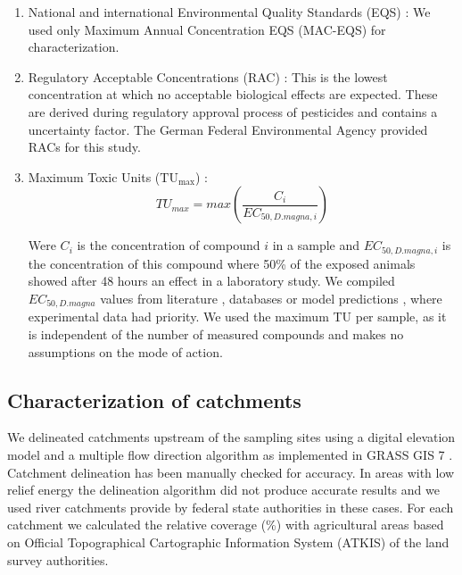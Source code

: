 \documentclass[journal=esthag,manuscript=article]{achemso}
\begin{document}
\begin{enumerate}
\item National and international Environmental Quality Standards (EQS) \citep{ogewv_verordnung_2011,european_union_directive_2013}:
We used only Maximum Annual Concentration EQS (MAC-EQS) for characterization.

\item Regulatory Acceptable Concentrations (RAC) \citep{brock_linking_2010}:
This is the lowest concentration at which no acceptable biological effects are expected. 
These are derived during regulatory approval  process of pesticides and contains a uncertainty factor.
The German Federal Environmental Agency provided RACs for this study.

\item Maximum Toxic Units ($\mathrm{TU_{max}}$)  \citep{sprague_measurement_1970}: 
\begin{equation}
TU_{max} = max(\frac{C_i}{EC_{50, D.magna, i}})
\end{equation}

Were $C_i$ is the concentration of compound $i$ in a sample and $EC_{50, D.magna, i}$ is the concentration of this compound where 50\% of the exposed animals showed after 48 hours an effect in a laboratory study.
We compiled $EC_{50, D.magna}$ values from literature \citep{malaj_organic_2014}, databases \citep{pesticide_action_network_pan_2015,u.s._epa_ecotoxicology_2015} or model predictions \citep{schuurmann_quantitative_2011}, where experimental data had priority.
We used the maximum TU per sample, as it is independent of the number of measured compounds and makes no assumptions on the mode of action.
\end{enumerate}


\subsection{Characterization of catchments}
We delineated catchments upstream of the sampling sites using a digital elevation model \citep{eea_digital_2013} and a multiple flow direction algorithm \citep{holmgren_multiple_1994} as implemented in GRASS GIS 7 \citep{neteler_grass_2012}.
Catchment delineation has been manually checked for accuracy. 
In areas with low relief energy the delineation algorithm did not produce accurate results and we used river catchments provide by federal state authorities in these cases.
For each catchment we calculated the relative coverage (\%) with agricultural areas based on Official Topographical Cartographic Information System (ATKIS) of the land survey authorities.
\end{document}
